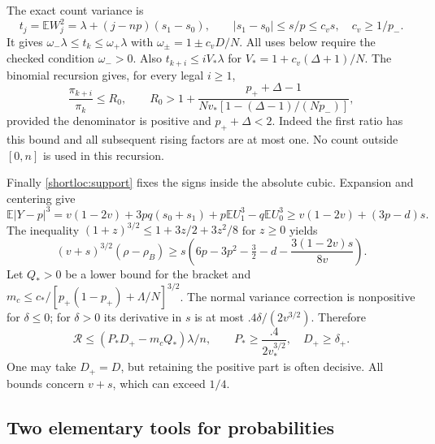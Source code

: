 The exact count variance is
\begin{equation}\label{shortloc:variance}
 t_j=\mathbb E W_j^2=\lambda+(j-np)(s_1-s_0),\qquad
 |s_1-s_0|\le s/p\le c_v s,\quad c_v\ge1/p_-.
\end{equation}
It gives $\omega_-\lambda\le t_k\le\omega_+\lambda$ with
$\omega_\pm=1\pm c_vD/N$. All uses below require the checked condition
$\omega_->0$. Also
$t_{k+i}\le iV_*\lambda$ for $V_*=1+c_v(\Delta+1)/N$.
The binomial recursion gives, for every legal $i\ge1$,
\begin{equation}\label{shortloc:ratio}
 \frac{\pi_{k+i}}{\pi_k}\le R_0,
 \qquad R_0>1+\frac{p_++\Delta-1}
 {Nv_*[1-(\Delta-1)/(Np_-)]},
\end{equation}
provided the denominator is positive and $p_++\Delta<2$.
Indeed the first ratio has this bound and all subsequent rising factors
are at most one. No count outside $[0,n]$ is used in this recursion.

Finally \eqref{shortloc:support} fixes the signs inside the absolute cubic.
Expansion and centering give
\[
 \mathbb E|Y-p|^3=v(1-2v)+3pq(s_0+s_1)
                   +p\mathbb E U_1^3-q\mathbb E U_0^3
 \ge v(1-2v)+(3p-d)s.
\]
The inequality $(1+z)^{3/2}\le1+3z/2+3z^2/8$ for $z\ge0$ yields
\begin{equation}\label{shortloc:cubic}
 (v+s)^{3/2}(\rho-\rho_B)\ge s
     \left(6p-3p^2-\tfrac32-d-\frac{3(1-2v)s}{8v}\right).
\end{equation}
Let $Q_*>0$ be a lower bound for the bracket and
$m_c\le c_*/[p_+(1-p_+)+\Lambda/N]^{3/2}$.
The normal variance correction is nonpositive for $\delta\le0$;
for $\delta>0$ its derivative in $s$ is at most $.4\delta/(2v^{3/2})$.
Therefore
\begin{equation}\label{shortloc:repair}
 \mathcal R\le(P_*D_+-m_cQ_*)\lambda/n,
 \qquad P_*\ge\frac{.4}{2v_*^{3/2}},\quad D_+\ge\delta_+.
\end{equation}
One may take $D_+=D$, but retaining the positive part is often decisive.
All bounds concern $v+s$, which can exceed $1/4$.

\subsection{Two elementary tools for probabilities}

